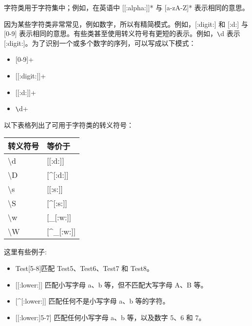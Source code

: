 字符类用于字符集中；例如，在英语中 [[:alpha:]]* 与 [a-zA-Z]* 表示相同的意思。

因为某些字符类非常常见，例如数字，所以有精简模式。例如，[:digit:] 和 [:d:] 与 [0-9] 表示相同的意思。有些类甚至使用转义符号有更短的表示。例如，\verb|\|d 表示 [:digit:]。为了识别一个或多个数字的序列，可以写成以下模式：

\begin{itemize}
\item
{}[0-9]+

\item
{}[[:digit:]]+

\item
{}[[:d:]]+

\item
\verb|\|d+
\end{itemize}

以下表格列出了可用于字符类的转义符号：

\begin{longtable}{|l|l|}
\hline
\textbf{转义符号} & \textbf{等价于}              \\ \hline
\endfirsthead
%
\endhead
%
\textbackslash{}d        & {[}{[}:d:{]}{]}                     \\ \hline
\textbackslash{}D        & {[}\textasciicircum{}{[}:d:{]}{]}   \\ \hline
\textbackslash{}s        & {[}{[}:s:{]}{]}                     \\ \hline
\textbackslash{}S        & {[}\textasciicircum{}{[}:s:{]}{]}   \\ \hline
\textbackslash{}w        & {[}\_{[}:w:{]}{]}                   \\ \hline
\textbackslash{}W        & {[}\textasciicircum{}\_{[}:w:{]}{]} \\ \hline
\end{longtable}

这里有些例子:

\begin{itemize}
\item
Test[5-8]匹配 Test5、Test6、Test7 和 Test8。

\item
{}[[:lower:]] 匹配小写字母 a、b 等，但不匹配大写字母 A、B 等。

\item
{}[\^{}[:lower:]] 匹配任何不是小写字母 a、b 等的字符。

\item
{}[[:lower:]5-7] 匹配任何小写字母 a、b 等，以及数字 5、6 和 7。
\end{itemize}

